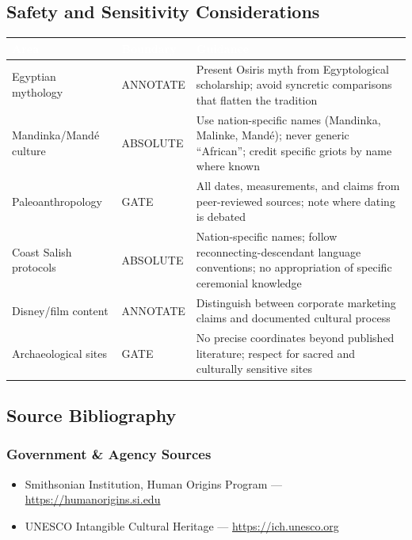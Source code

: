 \documentclass[11pt,letterpaper]{article}
\newcommand{\tableheader}[1]{\textbf{\sffamily\textcolor{white}{#1}}}
\begin{document}
\subsection{Safety and Sensitivity Considerations}

\begin{center}
\begin{tabularx}{\textwidth}{L{3cm}L{2cm}X}
\toprule
{}
\tableheader{Area} & \tableheader{Boundary} & \tableheader{Guidance} \\
\midrule
Egyptian mythology & ANNOTATE & Present Osiris myth from Egyptological scholarship; avoid syncretic comparisons that flatten the tradition \\
Mandinka/Mand\'{e} culture & ABSOLUTE & Use nation-specific names (Mandinka, Malinke, Mand\'{e}); never generic ``African''; credit specific griots by name where known \\
Paleoanthropology & GATE & All dates, measurements, and claims from peer-reviewed sources; note where dating is debated \\
Coast Salish protocols & ABSOLUTE & Nation-specific names; follow reconnecting-descendant language conventions; no appropriation of specific ceremonial knowledge \\
Disney/film content & ANNOTATE & Distinguish between corporate marketing claims and documented cultural process \\
Archaeological sites & GATE & No precise coordinates beyond published literature; respect for sacred and culturally sensitive sites \\
\bottomrule
\end{tabularx}
\end{center}

\subsection{Source Bibliography}

\subsubsection*{Government \& Agency Sources}
\begin{itemize}[leftmargin=2em]
  \item Smithsonian Institution, Human Origins Program --- \url{https://humanorigins.si.edu}
  \item UNESCO Intangible Cultural Heritage --- \url{https://ich.unesco.org}
\end{itemize}
\end{document}
